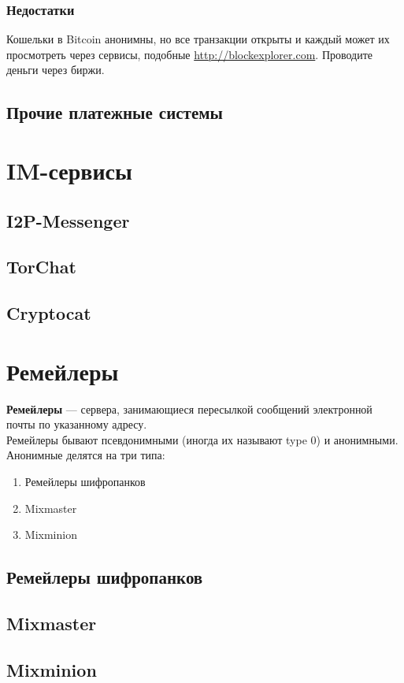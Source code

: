 \subsubsection{Недостатки}
\begin{important}
Кошельки в Bitcoin анонимны, но все транзакции открыты и каждый может их просмотреть через сервисы, подобные \url{http://blockexplorer.com}. Проводите деньги через биржи.
\end{important}
\subsection{Прочие платежные системы}

\section{IM-сервисы}
\subsection{I2P-Messenger}
\subsection{TorChat}
\subsection{Cryptocat}

\section{Ремейлеры}
\textbf{Ремейлеры} --- сервера, занимающиеся пересылкой сообщений электронной почты по указанному адресу.\\
Ремейлеры бывают псевдонимными (иногда их называют type 0) и анонимными. Анонимные делятся на три типа:
\begin{enumerate}
\item Ремейлеры шифропанков
\item Mixmaster 
\item Mixminion
\end{enumerate}
\subsection{Ремейлеры шифропанков}
\subsection{Mixmaster}
\subsection{Mixminion}

